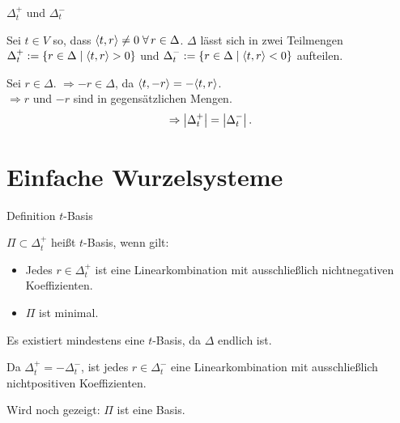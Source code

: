 \documentclass[18pt, handout]{beamer}
\begin{document}
\begin{frame}{\( \Delta_t^+ \) und \( \Delta_t^- \)}
    \begin{defi}
        Sei \( t \in V \) so, dass \( \scalarprod{t}{r} \neq 0 
        \; \forall r \in \Delta \).\pause
        \( \Delta \) lässt sich in zwei Teilmengen 
        \( \Delta_t^+ := 
        \{r \in \Delta \;\vert \; \langle t, r \rangle > 0\} \) 
        und \( \Delta_t^- := 
        \{r \in \Delta \;\vert \; \langle t, r \rangle < 0\} \) 
        aufteilen. \pause
    \end{defi}
    

    Sei \( r \in \Delta \). \( \Rightarrow -r \in \Delta \), 
    da \( \langle t, -r \rangle = -\langle t, r \rangle \).\\
    \( \Rightarrow r \) und \( -r \) sind in 
    gegensätzlichen Mengen. \pause
    \[ \Rightarrow \left|\Delta_t^+\right| = \left|\Delta_t^-\right|. \]
\end{frame}

\section{Einfache Wurzelsysteme}
\begin{frame}{Definition \( t \)-Basis}
    \begin{defi}
        \( \Pi \subset \Delta_t^+ \) heißt \( t \)-Basis, 
        wenn gilt:
        \begin{itemize}
            \item Jedes \( r \in \Delta_t^+ \) ist 
            eine Linearkombination mit ausschließlich 
            nichtnegativen Koeffizienten.
            \item \( \Pi \) ist minimal.
        \end{itemize} \pause
        Es existiert mindestens eine \( t \)-Basis, 
        da \( \Delta \) endlich ist. \pause
    \end{defi}
    
    
    Da \( \Delta_t^+ = - \Delta_t^- \), ist jedes 
    \( r \in \Delta_t^- \) eine Linearkombination 
    mit ausschließlich nichtpositiven Koeffizienten.

    \pause
    Wird noch gezeigt: \( \Pi \) ist eine Basis.
\end{frame}
\end{document}
